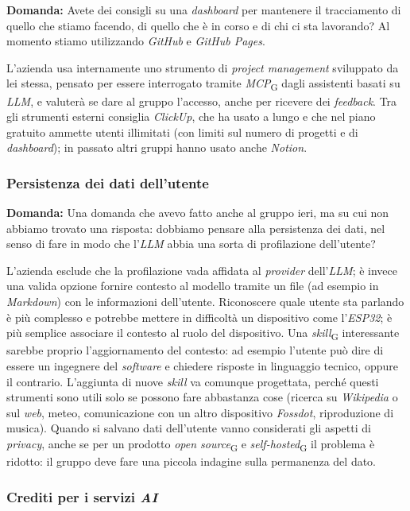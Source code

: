 \documentclass[12pt,a4paper]{article}
\newcommand{\gl}[1]{\emph{#1}\textsubscript{\scriptsize G}}
\begin{document}
\textbf{Domanda:} Avete dei consigli su una \emph{dashboard} per mantenere il tracciamento di quello che stiamo facendo, di quello che è in corso e di chi ci sta lavorando? Al momento stiamo utilizzando \emph{GitHub} e \emph{GitHub Pages}.

L'azienda usa internamente uno strumento di \emph{project management} sviluppato da lei stessa, pensato per essere interrogato tramite \gl{MCP} dagli assistenti basati su \emph{LLM}, e valuterà se dare al gruppo l'accesso, anche per ricevere dei \emph{feedback}. Tra gli strumenti esterni consiglia \emph{ClickUp}, che ha usato a lungo e che nel piano gratuito ammette utenti illimitati (con limiti sul numero di progetti e di \emph{dashboard}); in passato altri gruppi hanno usato anche \emph{Notion}.

\subsubsection{Persistenza dei dati dell'utente}

\textbf{Domanda:} Una domanda che avevo fatto anche al gruppo ieri, ma su cui non abbiamo trovato una risposta: dobbiamo pensare alla persistenza dei dati, nel senso di fare in modo che l'\emph{LLM} abbia una sorta di profilazione dell'utente?

L'azienda esclude che la profilazione vada affidata al \emph{provider} dell'\emph{LLM}; è invece una valida opzione fornire contesto al modello tramite un file (ad esempio in \emph{Markdown}) con le informazioni dell'utente. Riconoscere quale utente sta parlando è più complesso e potrebbe mettere in difficoltà un dispositivo come l'\emph{ESP32}; è più semplice associare il contesto al ruolo del dispositivo. Una \gl{skill} interessante sarebbe proprio l'aggiornamento del contesto: ad esempio l'utente può dire di essere un ingegnere del \emph{software} e chiedere risposte in linguaggio tecnico, oppure il contrario. L'aggiunta di nuove \emph{skill} va comunque progettata, perché questi strumenti sono utili solo se possono fare abbastanza cose (ricerca su \emph{Wikipedia} o sul \emph{web}, meteo, comunicazione con un altro dispositivo \emph{Fossdot}, riproduzione di musica). Quando si salvano dati dell'utente vanno considerati gli aspetti di \emph{privacy}, anche se per un prodotto \gl{open source} e \gl{self-hosted} il problema è ridotto: il gruppo deve fare una piccola indagine sulla permanenza del dato.

\subsubsection{\texorpdfstring{Crediti per i servizi \emph{AI}}{Crediti per i servizi AI}}
\end{document}
